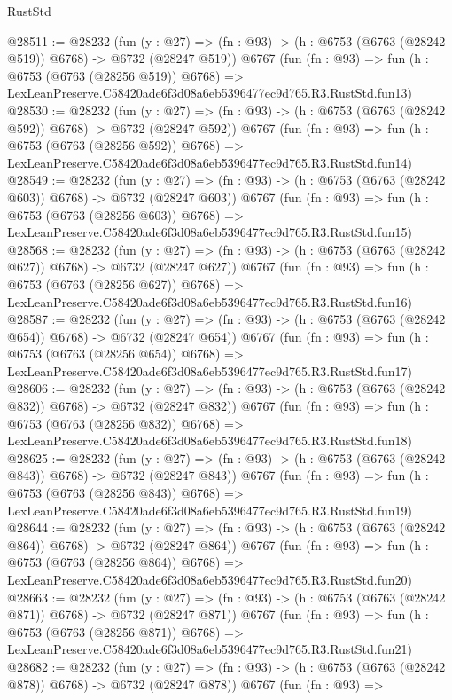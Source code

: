 \begin{lexlean}{RustStd}
\begin{coremodule}
@28511 := @28232
    (fun (y : @27) => (fn : @93) -> (h : @6753 (@6763 (@28242 @519)) @6768) -> @6732 (@28247 @519))
    @6767
    (fun (fn : @93) =>
    fun (h : @6753 (@6763 (@28256 @519)) @6768) =>
    LexLeanPreserve.C58420ade6f3d08a6eb5396477ec9d765.R3.RustStd.fun13)
@28530 := @28232
    (fun (y : @27) => (fn : @93) -> (h : @6753 (@6763 (@28242 @592)) @6768) -> @6732 (@28247 @592))
    @6767
    (fun (fn : @93) =>
    fun (h : @6753 (@6763 (@28256 @592)) @6768) =>
    LexLeanPreserve.C58420ade6f3d08a6eb5396477ec9d765.R3.RustStd.fun14)
@28549 := @28232
    (fun (y : @27) => (fn : @93) -> (h : @6753 (@6763 (@28242 @603)) @6768) -> @6732 (@28247 @603))
    @6767
    (fun (fn : @93) =>
    fun (h : @6753 (@6763 (@28256 @603)) @6768) =>
    LexLeanPreserve.C58420ade6f3d08a6eb5396477ec9d765.R3.RustStd.fun15)
@28568 := @28232
    (fun (y : @27) => (fn : @93) -> (h : @6753 (@6763 (@28242 @627)) @6768) -> @6732 (@28247 @627))
    @6767
    (fun (fn : @93) =>
    fun (h : @6753 (@6763 (@28256 @627)) @6768) =>
    LexLeanPreserve.C58420ade6f3d08a6eb5396477ec9d765.R3.RustStd.fun16)
@28587 := @28232
    (fun (y : @27) => (fn : @93) -> (h : @6753 (@6763 (@28242 @654)) @6768) -> @6732 (@28247 @654))
    @6767
    (fun (fn : @93) =>
    fun (h : @6753 (@6763 (@28256 @654)) @6768) =>
    LexLeanPreserve.C58420ade6f3d08a6eb5396477ec9d765.R3.RustStd.fun17)
@28606 := @28232
    (fun (y : @27) => (fn : @93) -> (h : @6753 (@6763 (@28242 @832)) @6768) -> @6732 (@28247 @832))
    @6767
    (fun (fn : @93) =>
    fun (h : @6753 (@6763 (@28256 @832)) @6768) =>
    LexLeanPreserve.C58420ade6f3d08a6eb5396477ec9d765.R3.RustStd.fun18)
@28625 := @28232
    (fun (y : @27) => (fn : @93) -> (h : @6753 (@6763 (@28242 @843)) @6768) -> @6732 (@28247 @843))
    @6767
    (fun (fn : @93) =>
    fun (h : @6753 (@6763 (@28256 @843)) @6768) =>
    LexLeanPreserve.C58420ade6f3d08a6eb5396477ec9d765.R3.RustStd.fun19)
@28644 := @28232
    (fun (y : @27) => (fn : @93) -> (h : @6753 (@6763 (@28242 @864)) @6768) -> @6732 (@28247 @864))
    @6767
    (fun (fn : @93) =>
    fun (h : @6753 (@6763 (@28256 @864)) @6768) =>
    LexLeanPreserve.C58420ade6f3d08a6eb5396477ec9d765.R3.RustStd.fun20)
@28663 := @28232
    (fun (y : @27) => (fn : @93) -> (h : @6753 (@6763 (@28242 @871)) @6768) -> @6732 (@28247 @871))
    @6767
    (fun (fn : @93) =>
    fun (h : @6753 (@6763 (@28256 @871)) @6768) =>
    LexLeanPreserve.C58420ade6f3d08a6eb5396477ec9d765.R3.RustStd.fun21)
@28682 := @28232
    (fun (y : @27) => (fn : @93) -> (h : @6753 (@6763 (@28242 @878)) @6768) -> @6732 (@28247 @878))
    @6767
    (fun (fn : @93) =>

\end{coremodule}
\end{lexlean}
